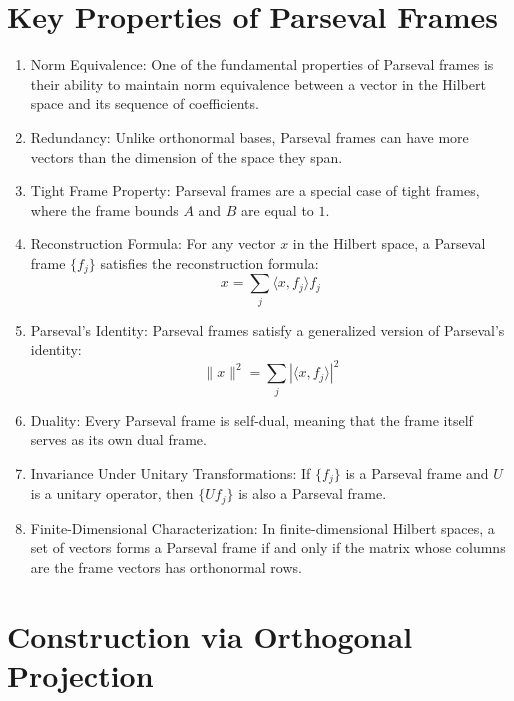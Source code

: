 \documentclass{article}
\begin{document}
\section{Key Properties of Parseval Frames}

\begin{enumerate}
  \item Norm Equivalence: One of the fundamental properties of Parseval frames
  is their ability to maintain norm equivalence between a vector in the
  Hilbert space and its sequence of coefficients.
  
  \item Redundancy: Unlike orthonormal bases, Parseval frames can have more
  vectors than the dimension of the space they span.
  
  \item Tight Frame Property: Parseval frames are a special case of tight
  frames, where the frame bounds $A$ and $B$ are equal to $1$.
  
  \item Reconstruction Formula: For any vector $x$ in the Hilbert space, a
  Parseval frame $\{f_j \}$ satisfies the reconstruction formula:
  \begin{equation}
    x = \sum_j \langle x, f_j \rangle f_j
  \end{equation}
  \item Parseval's Identity: Parseval frames satisfy a generalized version of
  Parseval's identity:
  \begin{equation}
    \|x\|^2 = \sum_j | \langle x, f_j \rangle |^2
  \end{equation}
  \item Duality: Every Parseval frame is self-dual, meaning that the frame
  itself serves as its own dual frame.
  
  \item Invariance Under Unitary Transformations: If $\{f_j \}$ is a Parseval
  frame and $U$ is a unitary operator, then $\{Uf_j \}$ is also a Parseval
  frame.
  
  \item Finite-Dimensional Characterization: In finite-dimensional Hilbert
  spaces, a set of vectors forms a Parseval frame if and only if the matrix
  whose columns are the frame vectors has orthonormal rows.
\end{enumerate}

\section{Construction via Orthogonal Projection}
\end{document}
